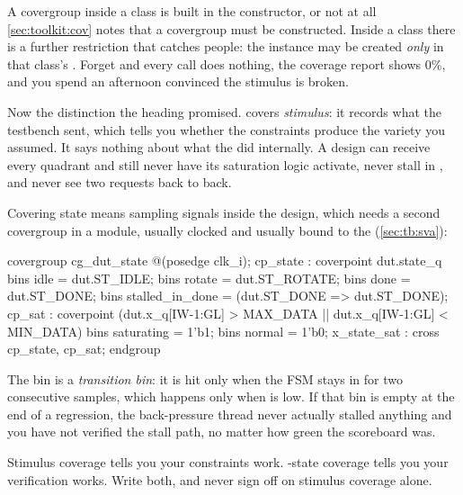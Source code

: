 \begin{gotcha}{A covergroup inside a class is built in the constructor, or not at all}
\cref{sec:toolkit:cov} notes that a covergroup must be constructed. Inside a class
there is a further restriction that catches people: the instance may be created
\emph{only} in that class's . Forget
 and every  call does nothing, the
coverage report shows 0\%, and you spend an afternoon convinced the stimulus is
broken.
\end{gotcha}

Now the distinction the heading promised.  covers
\emph{stimulus}: it records what the testbench sent, which tells you whether
the constraints produce the variety you assumed. It says nothing about what the
\DUT{} did internally. A design can receive every quadrant and still never have
its saturation logic activate, never stall in , and never see
two requests back to back.

Covering \DUT{} state means sampling signals inside the design, which needs a
second covergroup in a module, usually clocked and usually bound to the \DUT{}
(\cref{sec:tb:sva}):

\begin{svcode}[caption={Covering DUT state rather than stimulus},label={lst:tb:covstate}]
covergroup cg_dut_state @(posedge clk_i);
  cp_state : coverpoint dut.state_q {
    bins idle   = {dut.ST_IDLE};
    bins rotate = {dut.ST_ROTATE};
    bins done   = {dut.ST_DONE};
    bins stalled_in_done = (dut.ST_DONE => dut.ST_DONE);
  }
  cp_sat : coverpoint (dut.x_q[IW-1:GL] > MAX_DATA ||
                       dut.x_q[IW-1:GL] < MIN_DATA) {
    bins saturating = {1'b1};
    bins normal     = {1'b0};
  }
  x_state_sat : cross cp_state, cp_sat;
endgroup
\end{svcode}

The  bin is a \emph{transition bin}: it is hit
only when the FSM stays in  for two consecutive samples, which
happens only when  is low. If that bin is empty at the end of
a regression, the back-pressure thread never actually stalled anything and you
have not verified the stall path, no matter how green the scoreboard was.

\begin{ruleofthumb}
Stimulus coverage tells you your constraints work. \DUT{}-state coverage tells
you your verification works. Write both, and never sign off on stimulus
coverage alone.
\end{ruleofthumb}


